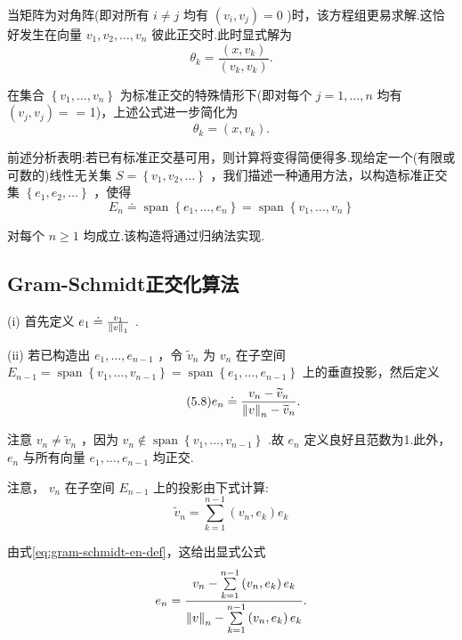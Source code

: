 当矩阵为对角阵(即对所有 $i \neq  j$ 均有 $\left( {{v}_{i},{v}_{j}}\right)  = 0$ )时，该方程组更易求解.这恰好发生在向量 ${v}_{1},{v}_{2},\ldots ,{v}_{n}$ 彼此正交时.此时显式解为
\[
{\theta }_{k} = \frac{\left( x,{v}_{k}\right) }{\left( {v}_{k},{v}_{k}\right) }.
\]

在集合 $\left\{  {{v}_{1},\ldots ,{v}_{n}}\right\}$ 为标准正交的特殊情形下(即对每个 $j = 1,\ldots ,n$ 均有 $\left( {{v}_{j},{v}_{j}}\right)  =$ = 1)，上述公式进一步简化为
\[
{\theta }_{k} = \left( {x,{v}_{k}}\right) .
\]

前述分析表明:若已有标准正交基可用，则计算将变得简便得多.现给定一个(有限或可数的)线性无关集 $S = \left\{  {{v}_{1},{v}_{2},\ldots }\right\}$ ，我们描述一种通用方法，以构造标准正交集 $\left\{  {{e}_{1},{e}_{2},\ldots }\right\}$ ，使得
\[
{E}_{n} \doteq  \operatorname{span}\left\{  {{e}_{1},\ldots ,{e}_{n}}\right\}   = \operatorname{span}\left\{  {{v}_{1},\ldots ,{v}_{n}}\right\}
\]

对每个 $n \geq  1$ 均成立.该构造将通过归纳法实现.

\subsection{Gram-Schmidt正交化算法}

(i) 首先定义 ${e}_{1} \doteq  \frac{{v}_{1}}{\norm{v}_{1}}$ .

(ii) 若已构造出 ${e}_{1},\ldots ,{e}_{n - 1}$ ，令 ${\widetilde{v}}_{n}$ 为 ${v}_{n}$ 在子空间 ${E}_{n - 1} = \operatorname{span}\left\{  {{v}_{1},\ldots ,{v}_{n - 1}}\right\}   = \operatorname{span}\left\{  {{e}_{1},\ldots ,{e}_{n - 1}}\right\}$ 上的垂直投影，然后定义
\begin{equation}\tag{5.8}\label{eq:gram-schmidt-en-def}
{e}_{n} \doteq  \frac{{v}_{n} - {\widetilde{v}}_{n}}{\norm{v}_{n} - {\widetilde{v}}_{n}}.
\end{equation}

注意 ${v}_{n} \neq  {\widetilde{v}}_{n}$ ，因为 ${v}_{n} \notin  \operatorname{span}\left\{  {{v}_{1},\ldots ,{v}_{n - 1}}\right\}$ .故 ${e}_{n}$ 定义良好且范数为1.此外， ${e}_{n}$ 与所有向量 ${e}_{1},\ldots ,{e}_{n - 1}$ 均正交.

注意， ${v}_{n}$ 在子空间 ${E}_{n - 1}$ 上的投影由下式计算:
\[
{\widetilde{v}}_{n} = \sum\limits_{{k = 1}}^{{n - 1}}\left( {{v}_{n},{e}_{k}}\right) {e}_{k}
\]

由式\eqref{eq:gram-schmidt-en-def}，这给出显式公式
\[
{e}_{n} = \frac{{v}_{n} - \sum\limits_{{k = 1}}^{{n - 1}}\left( {{v}_{n},{e}_{k}}\right) {e}_{k}}{\norm{v}_{n} - \sum\limits_{{k = 1}}^{{n - 1}}\left( {v}_{n},{e}_{k}\right) {e}_{k}}.
\]

